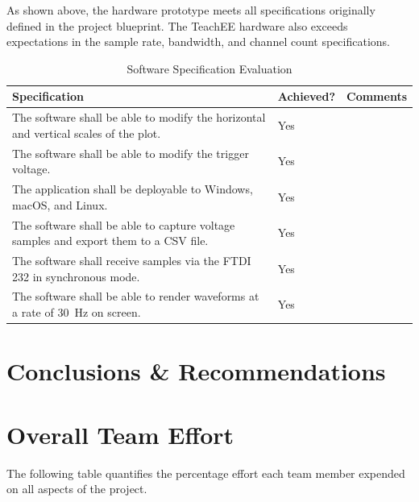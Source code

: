 \documentclass[letterpaper,11pt]{article}
\begin{document}
As shown above, the hardware prototype meets all specifications originally
defined in the project blueprint. The TeachEE hardware also exceeds expectations
in the sample rate, bandwidth, and channel count specifications.

\begin{table}[H]
  \caption{Software Specification Evaluation}
  \begin{tabularx}{\textwidth}{l|l|p{5cm}}
    Specification & Achieved? & Comments\\
    \hline
    The software shall be able to modify the horizontal and vertical scales of the plot. & Yes & \\
    The software shall be able to modify the trigger voltage. & Yes & \\
    The application shall be deployable to Windows, macOS, and Linux. & Yes & \\
    \hline
    The software shall be able to capture voltage samples and export them to a CSV file. & Yes & \\
    The software shall receive samples via the FTDI 232 in synchronous mode. & Yes & \\
    \hline
    The software shall be able to render waveforms at a rate of \SI{30}{\hertz} on screen. & Yes & \\
    \hline
  \end{tabularx} 
  \label{tab:sw-spec-eval}
\end{table}
\section{Conclusions \& Recommendations} %

\section{Overall Team Effort}
The following table quantifies the percentage effort each team member expended
on all aspects of the project.
\end{document}
